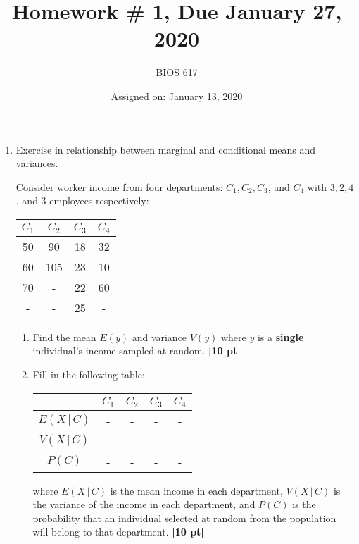 \documentclass[12pt]{article}
\def\given{\, | \,}
\begin{document}
\title{Homework \# 1, Due January 27, 2020}
\author{BIOS 617}
\date{Assigned on: January 13, 2020}

\maketitle

\begin{enumerate}
\setlength{\itemsep}{15pt}%
\setlength{\parskip}{15pt}%

\item Exercise in relationship between marginal and conditional means and variances.

Consider worker income from four departments: $C_1, C_2, C_3$, and $C_4$ with $3, 2, 4$, and $3$ employees respectively:

\begin{table}[!th]
\centering
\begin{tabular}{| c c c c |}
\hline
$C_1$ & $C_2$ & $C_3$ & $C_4$ \\ \hline
50 & 90 & 18 & 32 \\
60 & 105 & 23 & 10 \\
70 & - & 22 & 60 \\
- & - & 25 & - \\ \hline
\end{tabular}
\end{table}

	\begin{enumerate}
		\setlength{\itemsep}{15pt}%
		\setlength{\parskip}{15pt}%

		\item Find the mean $E(y)$ and variance $V(y)$ where $y$ is a {\bf single} individual's income sampled at random. {\bf [10 pt]}
		\item Fill in the following table:
		\begin{table}[!th]
		\centering
		\begin{tabular}{| c | c c c c |} \hline
		& $C_1$ & $C_2$ & $C_3$ & $C_4$ \\ \hline
		$E(X \given C)$ & - & - & - & - \\
		$V(X \given C)$ & - & - & - & - \\
		$P(C)$ & - & - & - & - \\ \hline
		\end{tabular}
		\end{table}

		where $E ( X \given C )$ is the mean income in each department, $V ( X \given C )$ is the variance of the income in each department, and $P ( C )$ is the probability that an individual selected at random from the population will belong to that department. {\bf [10 pt]}


\end{enumerate}
\end{enumerate}
\end{document}
